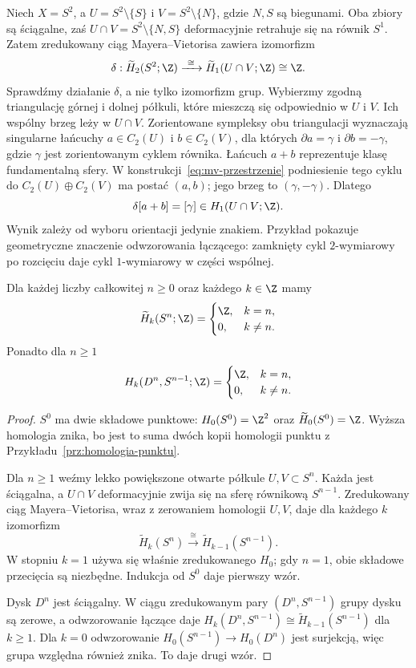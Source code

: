 \begin{przyklad}
\label{prz:mv-sfera-dwie-polkul}
Niech $X=S^2$, a $U=S^2\setminus\{S\}$ i
$V=S^2\setminus\{N\}$, gdzie $N,S$ są biegunami.
Oba zbiory są ściągalne, zaś
$U\cap V=S^2\setminus\{N,S\}$ deformacyjnie retrahuje się
na równik $S^1$. Zatem zredukowany ciąg
Mayera--Vietorisa zawiera izomorfizm
\[
 \delta:\widetilde H_2(S^2;\Z)
 \xrightarrow{\ \cong\ }\widetilde H_1(U\cap V;\Z)
 \cong\Z.
\]
Sprawdźmy działanie $\delta$, a nie tylko izomorfizm grup.
Wybierzmy zgodną triangulację górnej i dolnej półkuli,
które mieszczą się odpowiednio w $U$ i $V$.
Ich wspólny brzeg leży w $U\cap V$.
Zorientowane sympleksy obu triangulacji
wyznaczają singularne łańcuchy $a\in C_2(U)$
i $b\in C_2(V)$, dla których
$\partial a=\gamma$ i $\partial b=-\gamma$,
gdzie $\gamma$ jest zorientowanym cyklem równika.
Łańcuch $a+b$ reprezentuje klasę fundamentalną sfery.
W konstrukcji~\eqref{eq:mv-przestrzenie} podniesienie
tego cyklu do $C_2(U)\oplus C_2(V)$ ma postać $(a,b)$;
jego brzeg to $(\gamma,-\gamma)$.
Dlatego
\[
 \delta[a+b]=[\gamma]\in H_1(U\cap V;\Z).
\]
Wynik zależy od wyboru orientacji jedynie znakiem.
Przykład pokazuje geometryczne znaczenie odwzorowania
łączącego: zamknięty cykl $2$-wymiarowy
po rozcięciu daje cykl $1$-wymiarowy
w części wspólnej.
\end{przyklad}

\begin{twierdzenie}
\label{thm:homologia-sfer}
Dla każdej liczby całkowitej $n\geq0$
oraz każdego $k\in\Z$ mamy
\[
 \widetilde H_k(S^n;\Z)=
 \begin{cases}\Z,&k=n,\\0,&k\ne n.\end{cases}
\]
Ponadto dla $n\geq1$
\[
 H_k(D^n,S^{n-1};\Z)=
 \begin{cases}\Z,&k=n,\\0,&k\ne n.\end{cases}
\]
\end{twierdzenie}
\begin{proof}
$S^0$ ma dwie składowe punktowe:
$H_0(S^0)=\Z^2$ oraz
$\widetilde H_0(S^0)=\Z$.
Wyższa homologia znika, bo jest
to suma dwóch kopii homologii
punktu z Przykładu~\ref{prz:homologia-punktu}.

Dla $n\geq1$ weźmy lekko
powiększone otwarte półkule
$U,V\subset S^n$. Każda jest
ściągalna, a $U\cap V$
deformacyjnie zwija się na
sferę równikową $S^{n-1}$.
Zredukowany ciąg
Mayera--Vietorisa, wraz z
zerowaniem homologii $U,V$,
daje dla każdego $k$ izomorfizm
\[
 \widetilde H_k(S^n)
 \xrightarrow{\ \cong\ }
 \widetilde H_{k-1}(S^{n-1}).
\]
W stopniu $k=1$ używa się
właśnie zredukowanego $H_0$;
gdy $n=1$, obie składowe
przecięcia są niezbędne.
Indukcja od $S^0$ daje pierwszy wzór.

Dysk $D^n$ jest ściągalny. W ciągu
zredukowanym pary $(D^n,S^{n-1})$
grupy dysku są zerowe, a odwzorowanie
łączące daje
$H_k(D^n,S^{n-1})\cong
\widetilde H_{k-1}(S^{n-1})$
dla $k\geq1$. Dla $k=0$
odwzorowanie $H_0(S^{n-1})\to H_0(D^n)$
jest surjekcją, więc grupa
względna również znika.
To daje drugi wzór.
\end{proof}

